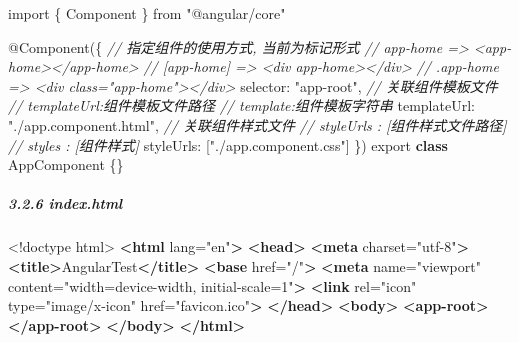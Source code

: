 \documentclass[
]{article}
\newenvironment{Shaded}{}{}
\newcommand{\CommentTok}[1]{\textcolor[rgb]{0.38,0.63,0.69}{\textit{#1}}}
\newcommand{\DataTypeTok}[1]{\textcolor[rgb]{0.56,0.13,0.00}{#1}}
\newcommand{\FunctionTok}[1]{\textcolor[rgb]{0.02,0.16,0.49}{#1}}
\newcommand{\ImportTok}[1]{#1}
\newcommand{\KeywordTok}[1]{\textcolor[rgb]{0.00,0.44,0.13}{\textbf{#1}}}
\newcommand{\NormalTok}[1]{#1}
\newcommand{\OperatorTok}[1]{\textcolor[rgb]{0.40,0.40,0.40}{#1}}
\newcommand{\OtherTok}[1]{\textcolor[rgb]{0.00,0.44,0.13}{#1}}
\newcommand{\StringTok}[1]{\textcolor[rgb]{0.25,0.44,0.63}{#1}}
\begin{document}
\begin{Shaded}
\begin{Highlighting}[]
\ImportTok{import}\NormalTok{ \{ Component \} }\ImportTok{from} \StringTok{"@angular/core"}

\NormalTok{@}\FunctionTok{Component}\NormalTok{(\{}
  \CommentTok{// 指定组件的使用方式, 当前为标记形式}
  \CommentTok{// app{-}home   =\textgreater{}  \textless{}app{-}home\textgreater{}\textless{}/app{-}home\textgreater{}}
	\CommentTok{// [app{-}home] =\textgreater{}  \textless{}div app{-}home\textgreater{}\textless{}/div\textgreater{}}
  \CommentTok{// .app{-}home  =\textgreater{}  \textless{}div class="app{-}home"\textgreater{}\textless{}/div\textgreater{}}
  \DataTypeTok{selector}\OperatorTok{:} \StringTok{"app{-}root"}\OperatorTok{,}
  \CommentTok{// 关联组件模板文件}
  \CommentTok{// templateUrl:\textquotesingle{}组件模板文件路径\textquotesingle{}}
	\CommentTok{// template:\textasciigrave{}组件模板字符串\textasciigrave{}}
  \DataTypeTok{templateUrl}\OperatorTok{:} \StringTok{"./app.component.html"}\OperatorTok{,}
  \CommentTok{// 关联组件样式文件}
  \CommentTok{// styleUrls : [\textquotesingle{}组件样式文件路径\textquotesingle{}]}
	\CommentTok{// styles : [\textasciigrave{}组件样式\textasciigrave{}]}
  \DataTypeTok{styleUrls}\OperatorTok{:}\NormalTok{ [}\StringTok{"./app.component.css"}\NormalTok{]}
\NormalTok{\})}
\ImportTok{export} \KeywordTok{class}\NormalTok{ AppComponent \{\}}
\end{Highlighting}
\end{Shaded}

\hypertarget{326-indexhtml}{%
\subparagraph{3.2.6 index.html}\label{326-indexhtml}}

\begin{Shaded}
\begin{Highlighting}[]
\DataTypeTok{\textless{}!doctype }\NormalTok{html}\DataTypeTok{\textgreater{}}
\KeywordTok{\textless{}html}\OtherTok{ lang=}\StringTok{"en"}\KeywordTok{\textgreater{}}
\KeywordTok{\textless{}head\textgreater{}}
  \KeywordTok{\textless{}meta}\OtherTok{ charset=}\StringTok{"utf{-}8"}\KeywordTok{\textgreater{}}
  \KeywordTok{\textless{}title\textgreater{}}\NormalTok{AngularTest}\KeywordTok{\textless{}/title\textgreater{}}
  \KeywordTok{\textless{}base}\OtherTok{ href=}\StringTok{"/"}\KeywordTok{\textgreater{}}
  \KeywordTok{\textless{}meta}\OtherTok{ name=}\StringTok{"viewport"}\OtherTok{ content=}\StringTok{"width=device{-}width, initial{-}scale=1"}\KeywordTok{\textgreater{}}
  \KeywordTok{\textless{}link}\OtherTok{ rel=}\StringTok{"icon"}\OtherTok{ type=}\StringTok{"image/x{-}icon"}\OtherTok{ href=}\StringTok{"favicon.ico"}\KeywordTok{\textgreater{}}
\KeywordTok{\textless{}/head\textgreater{}}
\KeywordTok{\textless{}body\textgreater{}}
  \KeywordTok{\textless{}app{-}root\textgreater{}\textless{}/app{-}root\textgreater{}}
\KeywordTok{\textless{}/body\textgreater{}}
\KeywordTok{\textless{}/html\textgreater{}}
\end{Highlighting}
\end{Shaded}
\end{document}
